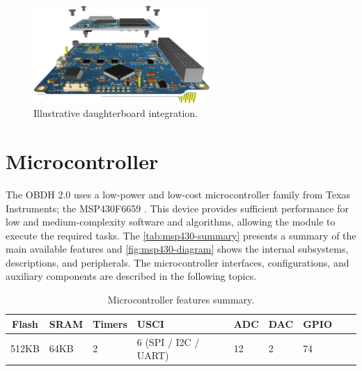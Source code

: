 \begin{figure}[!ht]
    \begin{center}
        \includegraphics[width=0.6\textwidth]{figures/daughterboard-integration.png}
        \caption{Illustrative daughterboard integration.}
        \label{fig:daughterboard-integration}
    \end{center}
\end{figure}

\section{Microcontroller}

The OBDH 2.0 uses a low-power and low-cost microcontroller family from Texas Instruments; the MSP430F6659 \cite{msp430f6659}. This device provides sufficient performance for low and medium-complexity software and algorithms, allowing the module to execute the required tasks. The \autoref{tab:msp430-summary} presents a summary of the main available features and \autoref{fig:msp430-diagram} shows the internal subsystems, descriptions, and peripherals. The microcontroller interfaces, configurations, and auxiliary components are described in the following topics.

\begin{table}[!ht]
    \centering
    \begin{tabular}{cllllllll}
        \toprule[1.5pt]
        \textbf{Flash} & \textbf{SRAM} & \textbf{Timers} & \textbf{USCI} & \textbf{ADC} & \textbf{DAC} & \textbf{GPIO} \\
        \midrule
        512KB  & 64KB  & 2  & 6 (SPI / I2C / UART)  & 12  & 2  & 74           \\
        \bottomrule[1.5pt]
    \end{tabular}
    \caption{Microcontroller features summary.}
    \label{tab:msp430-summary}
\end{table}


